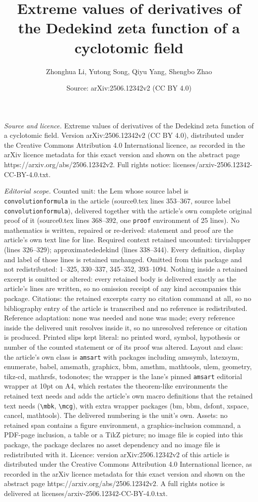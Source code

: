 \documentclass[10pt,a4paper]{amsart}
\title[Extreme values of derivatives of the Dedekind zeta function ]{Extreme values of derivatives of the Dedekind zeta function of a cyclotomic field}
\author{Zhonghua Li, Yutong Song, Qiyu Yang, Shengbo Zhao}
\date{Source: arXiv:2506.12342v2 (CC BY 4.0)}
\begin{document}
\maketitle

\noindent\emph{Source and licence.} Extreme values of derivatives of the Dedekind zeta function of a cyclotomic field. Version arXiv:2506.12342v2 (CC BY 4.0), distributed under the Creative Commons Attribution 4.0 International licence, as recorded in the arXiv licence metadata for this exact version and shown on the abstract page https://arxiv.org/abs/2506.12342v2. Full rights notice: licenses/arxiv-2506.12342-CC-BY-4.0.txt.\par\smallskip

\noindent\textit{Editorial scope.} Counted unit: the Lem whose source label is \texttt{convolutionformula} in the article (source0.tex lines 353--367, source label \texttt{convolutionformula}), delivered together with the article's own complete original proof of it (source0.tex lines 368--392, one \texttt{proof} environment of 25 lines). No mathematics is written, repaired or re-derived: statement and proof are the article's own text line for line. Required context retained uncounted: tirvialupper (lines 326--329); approximatededekind (lines 338--344). Every definition, display and label of those lines is retained unchanged. Omitted from this package and not redistributed: 1--325, 330--337, 345--352, 393--1094. Nothing inside a retained excerpt is omitted or altered: every retained body is delivered exactly as the article's lines are written, so no omission receipt of any kind accompanies this package. Citations: the retained excerpts carry no citation command at all, so no bibliography entry of the article is transcribed and no reference is redistributed. Reference adaptation: none was needed and none was made; every reference inside the delivered unit resolves inside it, so no unresolved reference or citation is produced. Printed slips kept literal: no printed word, symbol, hypothesis or number of the counted statement or of its proof was altered. Layout and class: the article's own class is \texttt{amsart} with packages including amssymb, latexsym, enumerate, babel, amsmath, graphicx, bbm, amsthm, mathtools, ulem, geometry, tikz-cd, mathrsfs, todonotes; the wrapper is the lane's pinned \texttt{amsart} editorial wrapper at 10pt on A4, which restates the theorem-like environments the retained text needs and adds the article's own macro definitions that the retained text needs (\texttt{\textbackslash mbk}, \texttt{\textbackslash mcg}), with extra wrapper packages (bm, bbm, dsfont, xspace, cancel, mathtools). The delivered numbering is the unit's own. Assets: no retained span contains a figure environment, a graphics-inclusion command, a PDF-page inclusion, a table or a TikZ picture; no image file is copied into this package, the package declares no asset dependency and no image file is redistributed with it. Licence: version arXiv:2506.12342v2 of this article is distributed under the Creative Commons Attribution 4.0 International licence, as recorded in the arXiv licence metadata for this exact version and shown on the abstract page https://arxiv.org/abs/2506.12342v2. A full rights notice is delivered at licenses/arxiv-2506.12342-CC-BY-4.0.txt. 
\end{document}
